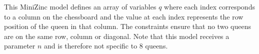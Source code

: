 This MiniZinc model defines an array of variables $q$ where each index corresponds to a column on the chessboard and the value at each index represents the row position of the queen in that column. The constraints ensure that no two queens are on the same row, column or diagonal. Note that this model receives a parameter $n$ and is therefore not specific to $8$ queens.

